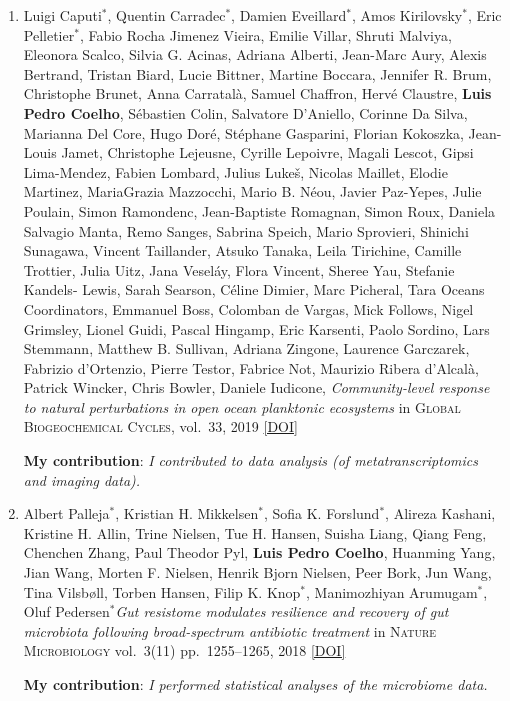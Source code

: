 \documentclass{article}
\newcommand\showdoi[1]{%
    \href{http://dx.doi.org/#1}{[DOI]}%
}
\newcommand\pubname[1]{\textsc{#1}}
\newcommand\contribution[1]{\relax\hfill\break\textbf{My contribution}: \textit{#1}}
\newcommand\costar{${}^{*}$}
\begin{document}
\begin{enumerate}[resume]
\item Luigi Caputi\costar, Quentin Carradec\costar, Damien Eveillard\costar,
Amos Kirilovsky\costar, Eric Pelletier\costar, Fabio Rocha Jimenez Vieira,
Emilie Villar, Shruti Malviya, Eleonora Scalco, Silvia G. Acinas, Adriana
Alberti, Jean-Marc Aury, Alexis Bertrand, Tristan Biard, Lucie Bittner, Martine
Boccara, Jennifer R. Brum, Christophe Brunet, Anna Carratalà, Samuel Chaffron,
Hervé Claustre, \textbf{Luis Pedro Coelho}, Sébastien Colin, Salvatore
D'Aniello, Corinne Da Silva, Marianna Del Core, Hugo Doré, Stéphane Gasparini,
Florian Kokoszka, Jean-Louis Jamet, Christophe Lejeusne, Cyrille Lepoivre,
Magali Lescot, Gipsi Lima-Mendez, Fabien Lombard, Julius Lukeš, Nicolas
Maillet, Elodie Martinez, MariaGrazia Mazzocchi, Mario B. Néou, Javier
Paz-Yepes, Julie Poulain, Simon Ramondenc, Jean-Baptiste Romagnan, Simon Roux,
Daniela Salvagio Manta, Remo Sanges, Sabrina Speich, Mario Sprovieri, Shinichi
Sunagawa, Vincent Taillander, Atsuko Tanaka, Leila Tirichine, Camille Trottier,
Julia Uitz, Jana Veseláy, Flora Vincent, Sheree Yau, Stefanie Kandels- Lewis,
Sarah Searson, Céline Dimier, Marc Picheral, Tara Oceans Coordinators, Emmanuel
Boss, Colomban de Vargas, Mick Follows, Nigel Grimsley, Lionel Guidi, Pascal
Hingamp, Eric Karsenti, Paolo Sordino, Lars Stemmann, Matthew B. Sullivan,
Adriana Zingone, Laurence Garczarek, Fabrizio d'Ortenzio, Pierre Testor,
Fabrice Not, Maurizio Ribera d'Alcalà, Patrick Wincker, Chris Bowler, Daniele
Iudicone, \emph{Community-level response to natural perturbations in open ocean
planktonic ecosystems} in \pubname{Global Biogeochemical Cycles}, vol.\ 33,
2019 \showdoi{10.1029/2018GB006022}
\contribution{I contributed to data analysis (of metatranscriptomics and
imaging data).}

\item Albert Palleja\costar, Kristian H. Mikkelsen\costar, Sofia K.
Forslund\costar, Alireza Kashani, Kristine H. Allin, Trine Nielsen, Tue H.
Hansen, Suisha Liang, Qiang Feng, Chenchen Zhang, Paul Theodor Pyl,
\textbf{Luis Pedro Coelho}, Huanming Yang, Jian Wang, Morten F. Nielsen, Henrik
Bjorn Nielsen, Peer Bork, Jun Wang, Tina Vilsbøll, Torben Hansen, Filip K.
Knop\costar, Manimozhiyan Arumugam\costar, Oluf Pedersen\costar \emph{Gut
resistome modulates resilience and recovery of gut microbiota following
broad-spectrum antibiotic treatment} in \pubname{Nature Microbiology} vol.\
3(11) pp.\ 1255--1265, 2018 \showdoi{10.1038/s41564-018-0257-9}
\contribution{I performed statistical analyses of the microbiome data.}


\end{enumerate}
\end{document}
